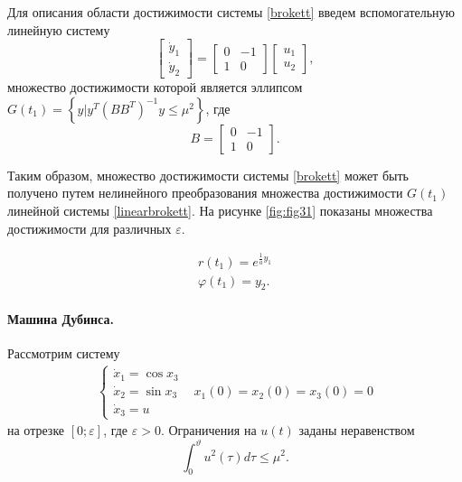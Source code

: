 \documentclass[../main.tex]{subfiles}
\begin{document}
Для описания области достижимости системы \eqref{brokett} введем вспомогательную линейную систему
\begin{equation}\label{linearbrokett}
	\left[ {\begin{array}{*{20}{c}}
			{{{\dot y}_1}}\\
			{{{\dot y}_2}}
	\end{array}} \right] = \left[ {\begin{array}{*{20}{c}}
			0&{ - 1}\\
			1&0
	\end{array}} \right]\left[ {\begin{array}{*{20}{c}}
			{{u_1}}\\
			{{u_2}}
	\end{array}} \right],
\end{equation}
множество достижимости которой является эллипсом $ G(t_1) = \left\lbrace y | y^T \left( B B^T\right)  ^{-1} y \leq \mu^2 \right\rbrace  $, где 
\begin{equation*}
	B = \left[ {\begin{array}{*{20}{c}}
			0&{ - 1}\\
			1&0
	\end{array}} \right].
\end{equation*}

Таким образом, множество достижимости системы \eqref{brokett} может быть получено путем нелинейного преобразования множества достижимости $ G(t_1) $ линейной системы \eqref{linearbrokett}. На рисунке  \ref{fig:fig31} показаны множества достижимости для различных $ \varepsilon $.


\begin{equation*}
	\begin{array}{l}
		r({t_1}) = {e^{ \frac{1}{a} y_1}}\\
		\varphi ({t_1}) =  y_2. 
	\end{array}
\end{equation*}
\paragraph{Машина Дубинса.} 
Рассмотрим систему 
\begin{equation}\label{system6}
	\begin{array}{*{20}{c}}
		{\left\{ {\begin{array}{*{20}{l}}
					{{{\dot x}_1} = \cos {x_3}}\\
					{{{\dot x}_2} = \sin {x_3}}\\
					{{{\dot x}_3} = u}
			\end{array}} \right.}&{{x_1}\left( 0 \right) = {x_2}\left( 0 \right) = {x_3}\left( 0 \right) = 0}
	\end{array}
\end{equation}
на отрезке $ \left[0;\varepsilon \right] $, где $ \varepsilon > 0 $. Ограничения на $ u\left(t \right) $ заданы неравенством 
\begin{equation}\label{constraints*}
	\int_{0}^{\vartheta} u^2(\tau) d\tau \leqslant \mu^2.
\end{equation}
\end{document}
